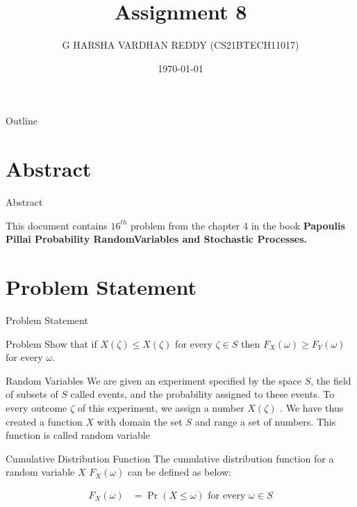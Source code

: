 \documentclass{beamer}
\title{Assignment 8}
\author[CS21BTECH11017]{G HARSHA VARDHAN REDDY (CS21BTECH11017)}
\date{\today}
\providecommand{\pr}[1]{\ensuremath{\Pr\left(#1\right)}}
\begin{document}
\begin{frame}
    \titlepage 
\end{frame}
\logo{}


\begin{frame}{Outline}
    \tableofcontents
\end{frame}

\section{Abstract}
\begin{frame}{Abstract}
\begin{block}{} This document contains $16^{th}$ problem from the chapter 4 in the book \textbf{Papoulis Pillai Probability RandomVariables and Stochastic Processes.}
\end{block}
    
\end{frame}

\section{Problem Statement}
\begin{frame}{Problem Statement}
    \begin{block} {Problem} Show that if $X(\zeta)\leq X(\zeta) $ for every $\zeta \in S$ then $F_X(\omega) \ge F_Y(\omega)$ for every $\omega$.
    \end{block}
\end{frame}
\begin{frame}{Random Variables}
We are given an experiment specified by the space $S$, the field of subsets of $S$
called events, and the probability assigned to these events. To every outcome $\zeta$ of this
experiment, we assign a number $X(\zeta)$ . We have thus created a function $X$ with domain
the set $S$ and range a set of numbers. This function is called random variable
\end{frame}
\begin{frame}{Cumulative Distribution Function}
The cumulative distribution function for a random variable $X$  $F_X(\omega)$ can be defined as below:

\begin{block}{}
\begin{align}
         F_X(\omega)&= \pr{X \leq \omega} \text{ for every } \omega \in S
         \label{eq1}
\end{align}
\end{block}

\end{frame}
\end{document}
